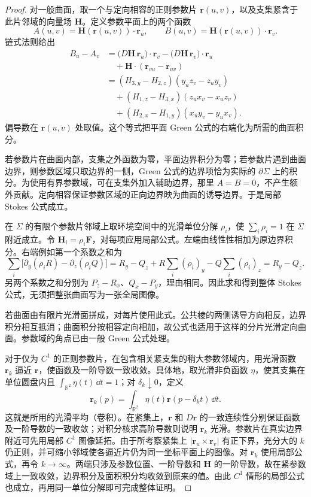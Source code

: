 \begin{remark}[闭曲线与封闭曲面对应的两种条件]
\begin{proof}
对一般曲面，取一个与定向相容的正则参数片 $\boldsymbol r(u,v)$，以及支集紧含于此片邻域的向量场 $\boldsymbol H$。定义参数平面上的两个函数
\[
A(u,v)=\boldsymbol H(\boldsymbol r(u,v))\cdot\boldsymbol r_u,
\qquad B(u,v)=\boldsymbol H(\boldsymbol r(u,v))\cdot\boldsymbol r_v.
\]
链式法则给出
\begin{align*}
B_u-A_v
&=\bigl(D\boldsymbol H\,\boldsymbol r_u\bigr)\cdot\boldsymbol r_v
-\bigl(D\boldsymbol H\,\boldsymbol r_v\bigr)\cdot\boldsymbol r_u\\
&\quad+\boldsymbol H\cdot(\boldsymbol r_{vu}-\boldsymbol r_{uv})\\
&=(H_{3,y}-H_{2,z})(y_uz_v-z_uy_v)\\
&\quad+(H_{1,z}-H_{3,x})(z_ux_v-x_uz_v)\\
&\quad+(H_{2,x}-H_{1,y})(x_uy_v-y_ux_v).
\end{align*}
偏导数在 $\boldsymbol r(u,v)$ 处取值。这个等式把平面 Green 公式的右端化为所需的曲面积分。

若参数片在曲面内部，支集之外函数为零，平面边界积分为零；若参数片遇到曲面边界，则参数区域只取边界的一侧，Green 公式的边界项恰为实际的 $\partial\Sigma$ 上的积分。为使用有界参数域，可在支集外加入辅助边界，那里 $A=B=0$，不产生额外贡献。定向相容保证参数区域的正向边界映为曲面的诱导边界。于是局部 Stokes 公式成立。

在 $\Sigma$ 的有限个参数片邻域上取环境空间中的光滑单位分解 $\rho_i$，使 $\sum_i\rho_i=1$ 在 $\Sigma$ 附近成立。令 $\boldsymbol H_i=\rho_i\boldsymbol F$，对每项应用局部公式。左端由线性性相加为原边界积分。右端例如第一个系数之和为
\[
\sum_i\bigl[\partial_y(\rho_iR)-\partial_z(\rho_iQ)\bigr]
=R_y-Q_z+R\sum_i(\rho_i)_y-Q\sum_i(\rho_i)_z
=R_y-Q_z.
\]
另两个系数之和分别为 $P_z-R_x$、$Q_x-P_y$，理由相同。因此求和得到整体 Stokes 公式，无须把整张曲面写为一张全局图像。

若曲面由有限片光滑面拼成，对每片使用此式。公共棱的两侧诱导方向相反，边界积分相互抵消；曲面积分按相容定向相加，故公式也适用于这样的分片光滑定向曲面。参数域的角点已由一般 Green 公式处理。

对于仅为 $C^1$ 的正则参数片，在包含相关紧支集的稍大参数邻域内，用光滑函数 $\boldsymbol r_k$ 逼近 $\boldsymbol r$，使函数及一阶导数一致收敛。具体地，取光滑非负函数 $\eta$，使其支集在单位圆盘内且 $\displaystyle \int_{\mathbb R^2}\eta(t)\,\dd t=1$；对 $\delta_k\downarrow0$，定义
\[
\boldsymbol r_k(p)=\int_{\mathbb R^2}\eta(t)\boldsymbol r(p-\delta_kt)\,\dd t.
\]
这就是所用的光滑平均（卷积）。在紧集上，$\boldsymbol r$ 和 $D\boldsymbol r$ 的一致连续性分别保证函数及一阶导数的一致收敛；对积分核求高阶导数则说明 $\boldsymbol r_k$ 光滑。参数片在真实边界附近可先用局部 $C^1$ 图像延拓。由于所考察紧集上 $|\boldsymbol r_u\times\boldsymbol r_v|$ 有正下界，充分大的 $k$ 仍正则，并可缩小邻域使各逼近片仍为同一坐标平面上的图像。对 $\boldsymbol r_k$ 使用局部公式，再令 $k\to\infty$。两端只涉及参数位置、一阶导数和 $\boldsymbol H$ 的一阶导数，故在紧参数域上一致收敛，边界积分及面积积分均收敛到原来的值。由此 $C^1$ 情形的局部公式也成立，再用同一单位分解即可完成整体证明。
\end{proof}


\end{remark}
